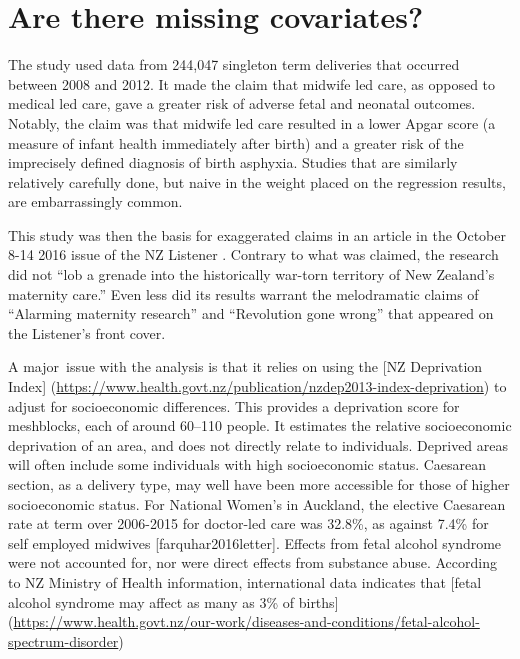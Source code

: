\documentclass[
  10pt,
  b5paper]{book}
\begin{document}
\hypertarget{are-there-missing-covariates}{%
\section{Are there missing covariates?}\label{are-there-missing-covariates}}

The \citep{wernham_EtAl_2016} study used data from 244,047 singleton term
deliveries that occurred between 2008 and 2012. It made the claim
that midwife led care, as opposed to medical led care, gave a
greater risk of adverse fetal and neonatal outcomes. Notably, the
claim was that midwife led care resulted in a lower Apgar score
(a measure of infant health immediately after birth) and a greater
risk of the imprecisely defined diagnosis of birth asphyxia.
Studies that are similarly relatively carefully done,
but naive in the weight placed on the regression results,
are embarrassingly common.

This study was then the basis for exaggerated claims in an article
in the October 8-14 2016 issue of the NZ
Listener \citep[ ``Birth Control'']{chisholm_2016}. Contrary to what was
claimed, the research did not
``lob a grenade into the historically war-torn territory of
New Zealand's maternity care.''
Even less did its results warrant the melodramatic claims of
``Alarming maternity research'' and ``Revolution gone wrong'' that
appeared on the Listener's front cover.

A major~issue with the analysis is that it relies on using
the {[}NZ Deprivation Index{]}
(\url{https://www.health.govt.nz/publication/nzdep2013-index-deprivation})
to adjust for socioeconomic differences. This provides a deprivation
score for meshblocks, each of around 60--110 people. It estimates the
relative socioeconomic deprivation of an area, and does not directly
relate to individuals. Deprived areas will often include some
individuals with high socioeconomic status. Caesarean section, as a
delivery type, may well have been more accessible for those of
higher socioeconomic status. For National Women's in Auckland,
the elective Caesarean rate at term over 2006-2015 for doctor-led
care was 32.8\%, as against 7.4\% for self employed midwives
{[}farquhar2016letter{]}. Effects from fetal alcohol syndrome were
not accounted for, nor were direct effects from substance abuse.
According to NZ Ministry of Health information, international data
indicates that
{[}fetal alcohol syndrome may affect as many as 3\% of births{]}
(\url{https://www.health.govt.nz/our-work/diseases-and-conditions/fetal-alcohol-spectrum-disorder})
\end{document}
